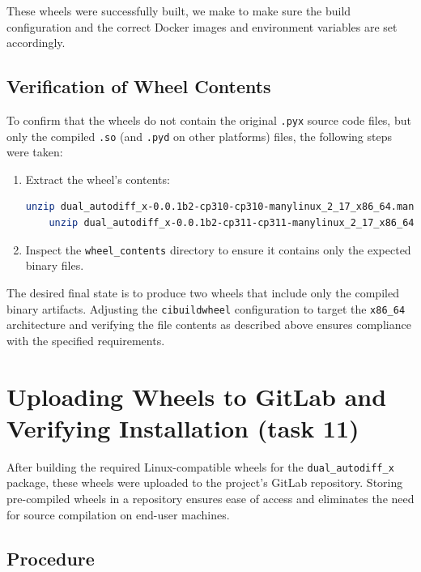 \documentclass[12.5pt]{article}
\begin{document}
These wheels were successfully built, we make to make sure the build configuration and the correct Docker images and environment variables are set accordingly. 

\subsection*{Verification of Wheel Contents}

To confirm that the wheels do not contain the original \texttt{.pyx} source code files, but only the compiled \texttt{.so} (and \texttt{.pyd} on other platforms) files, the following steps were taken:

\begin{enumerate}
    \item Extract the wheel's contents:
    \begin{lstlisting}[language=bash]
    unzip dual_autodiff_x-0.0.1b2-cp310-cp310-manylinux_2_17_x86_64.manylinux2014_x86_64.whl -d wheel_contents
    unzip dual_autodiff_x-0.0.1b2-cp311-cp311-manylinux_2_17_x86_64.manylinux2014_x86_64.whl -d wheel_contents\end{lstlisting}
    
    \item Inspect the \texttt{wheel\_contents} directory to ensure it contains only the expected binary files.
\end{enumerate}

The desired final state is to produce two wheels that include only the compiled binary artifacts. Adjusting the \texttt{cibuildwheel} configuration to target the \texttt{x86\_64} architecture and verifying the file contents as described above ensures compliance with the specified requirements.

\section{Uploading Wheels to GitLab and Verifying Installation (task 11)}

After building the required Linux-compatible wheels for the \texttt{dual\_autodiff\_x} package, these wheels were uploaded to the project's GitLab repository. Storing pre-compiled wheels in a  repository ensures ease of access and eliminates the need for source compilation on end-user machines.

\subsection{Procedure}
\end{document}
